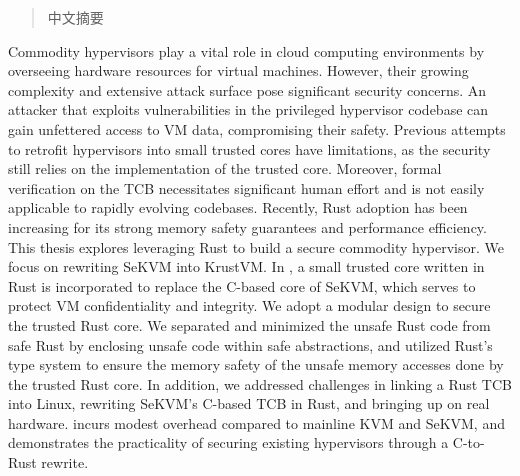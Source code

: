 
\begin{abstract}

中文摘要

\end{abstract}

\begin{abstract*}

Commodity hypervisors play a vital role in cloud computing environments by
overseeing hardware resources for virtual machines. However, their growing
complexity and extensive attack surface pose significant security concerns.
An attacker that exploits vulnerabilities in the privileged hypervisor
codebase can gain unfettered access to VM data, compromising their safety.
Previous attempts to retrofit hypervisors into small trusted cores have
limitations, as the security still relies on the implementation of the trusted
core. Moreover, formal verification on the TCB necessitates significant human
effort and is not easily applicable to rapidly evolving codebases.
Recently, Rust adoption has been increasing for its strong memory safety
guarantees and performance efficiency.
This thesis explores leveraging Rust to build a secure commodity hypervisor.
We focus on rewriting SeKVM into KrustVM.
In \rustsec{}, a small trusted core written in Rust is incorporated to replace
the C-based core of SeKVM, which serves to protect VM confidentiality and
integrity.
We adopt a modular design to secure the trusted Rust core. We separated and
minimized the unsafe Rust code from safe Rust by enclosing unsafe code within
safe abstractions, and utilized Rust's type system to ensure the memory safety
of the unsafe memory accesses done by the trusted Rust core.
In addition,
we addressed challenges in linking a Rust TCB into Linux, rewriting SeKVM's
C-based TCB in Rust, and bringing up \rustsec{} on real hardware.
\rustsec{} incurs modest overhead compared to mainline KVM and SeKVM, and
demonstrates the practicality of securing existing hypervisors through a
C-to-Rust rewrite.

\end{abstract*}
